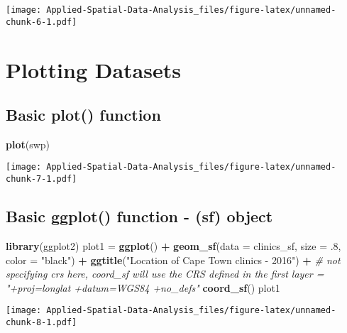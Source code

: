 \documentclass[
]{book}
\newenvironment{Shaded}{\begin{snugshade}}{\end{snugshade}}
\newcommand{\CommentTok}[1]{\textcolor[rgb]{0.56,0.35,0.01}{\textit{#1}}}
\newcommand{\DataTypeTok}[1]{\textcolor[rgb]{0.13,0.29,0.53}{#1}}
\newcommand{\FloatTok}[1]{\textcolor[rgb]{0.00,0.00,0.81}{#1}}
\newcommand{\KeywordTok}[1]{\textcolor[rgb]{0.13,0.29,0.53}{\textbf{#1}}}
\newcommand{\NormalTok}[1]{#1}
\newcommand{\OperatorTok}[1]{\textcolor[rgb]{0.81,0.36,0.00}{\textbf{#1}}}
\newcommand{\StringTok}[1]{\textcolor[rgb]{0.31,0.60,0.02}{#1}}
\begin{document}
\texttt{[image: Applied-Spatial-Data-Analysis\_files/figure-latex/unnamed-chunk-6-1.pdf]}

\hypertarget{plotting-datasets}{%
\section{Plotting Datasets}\label{plotting-datasets}}

\hypertarget{basic-plot-function}{%
\subsection{Basic plot() function}\label{basic-plot-function}}

\begin{Shaded}
\begin{Highlighting}[]
\KeywordTok{plot}\NormalTok{(swp)}
\end{Highlighting}
\end{Shaded}

\texttt{[image: Applied-Spatial-Data-Analysis\_files/figure-latex/unnamed-chunk-7-1.pdf]}

\hypertarget{basic-ggplot-function---sf-object}{%
\subsection{Basic ggplot() function - (sf) object}\label{basic-ggplot-function---sf-object}}

\begin{Shaded}
\begin{Highlighting}[]
\KeywordTok{library}\NormalTok{(ggplot2)}
\NormalTok{plot1 =}\StringTok{ }\KeywordTok{ggplot}\NormalTok{() }\OperatorTok{+}\StringTok{ }
\StringTok{  }\KeywordTok{geom_sf}\NormalTok{(}\DataTypeTok{data =}\NormalTok{ clinics_sf, }\DataTypeTok{size =} \FloatTok{.8}\NormalTok{, }\DataTypeTok{color =} \StringTok{"black"}\NormalTok{) }\OperatorTok{+}\StringTok{ }
\StringTok{  }\KeywordTok{ggtitle}\NormalTok{(}\StringTok{"Location of Cape Town clinics - 2016"}\NormalTok{) }\OperatorTok{+}\StringTok{ }
\StringTok{  }\CommentTok{# not specifying crs here, coord_sf will use the CRS defined in the first layer = "+proj=longlat +datum=WGS84 +no_defs"}
\StringTok{  }\KeywordTok{coord_sf}\NormalTok{() }
\NormalTok{plot1}
\end{Highlighting}
\end{Shaded}

\texttt{[image: Applied-Spatial-Data-Analysis\_files/figure-latex/unnamed-chunk-8-1.pdf]}
\end{document}
